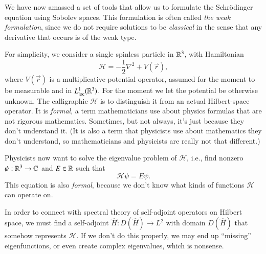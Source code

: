 We have now amassed a set of tools that allow us to formulate the Schr\"odinger equation using Sobolev spaces. This formulation is often called \emph{the weak formulation}, since we do not require solutions to be \emph{classical} in the sense that any derivative that occurs is of the weak type.

For simplicity, we consider a single spinless particle in $\mathbb{R}^3$, with Hamiltonian
\begin{equation}
 \mathcal{H} = - \frac{1}{2}\nabla^2 + V(\vec{r}),
\end{equation}
where $V(\vec{r})$ is a multiplicative potential operator, assumed for the moment to be measurable and in $L^1_\text{loc}(\mathbb{R}^3)$. For the moment we let the potential be otherwise unknown. The calligraphic $\mathcal{H}$ is to distinguish it from an actual Hilbert-space operator. It is \emph{formal}, a term mathematicians use about physics formulas that are not rigorous mathematics. Sometimes, but not always, it's just because they don't understand it. (It is also a term that physicists use about mathematics they don't understand, so mathematicians and physicists are really not that different.)

Physicists now want to solve the eigenvalue problem of $\mathcal{H}$, i.e., find nonzero $\psi : \mathbb{R}^3 \to \mathbb{C}$ and $E\in \mathbb{R}$ such that
\begin{equation}
    \mathcal{H}\psi = E\psi. \label{eq:formal-se}
\end{equation}
This equation is also \emph{formal}, because we don't know what kinds of functions $\mathcal{H}$ can operate on.

In order to connect with spectral theory of self-adjoint operators on Hilbert space, we must find a self-adjoint $\hat{H} : D(\hat{H}) \to L^2$ with domain $D(\hat{H})$ that somehow represents $\mathcal{H}$. If we don't do this properly, we may end up ``missing'' eigenfunctions, or even create complex eigenvalues, which is nonsense.



